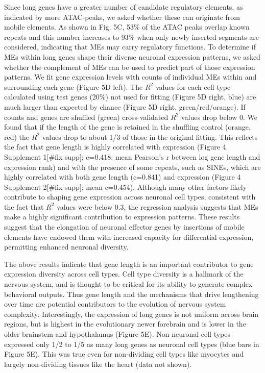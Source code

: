 Since long genes have a greater number of candidate regulatory elements, as indicated by more ATAC-peaks, we asked whether these can originate from mobile elements. As shown in Fig. 5C, 53\% of the ATAC peaks overlap known repeats and this number increases to 93\% when only newly inserted segments are considered, indicating that MEs may carry regulatory functions. To determine if MEs within long genes shape their diverse neuronal expression patterns, we asked whether the complement of MEs can be used to predict part of those expression patterns. We fit gene expression levels with counts of individual MEs within and surrounding each gene (Figure 5D left). The $R^2$ values for each cell type calculated using test genes (20\%) not used for fitting (Figure 5D right, blue) are much larger than expected by chance (Figure 5D right, green/red/orange). If counts and genes are shuffled (green) cross-validated $R^2$ values drop below 0. We found that if the length of the gene is retained in the shuffling control (orange, red) the $R^2$ values drop to about 1/3 of those in the original fitting. This reflects the fact that gene length is highly correlated with expression (Figure 4 Supplement 1[#fix supp]; c=0.418: mean Pearson’s r between log gene length and expression rank) and with the presence of some repeats, such as SINEs, which are highly correlated with both gene length (c=0.841) and expression (Figure 4 Supplement 2[#fix supp]; mean c=0.454). Although many other factors likely contribute to shaping gene expression across neuronal cell types, consistent with the fact that $R^2$ values were below 0.3, the regression analysis suggests that MEs make a highly significant contribution to expression patterns. These results suggest that the elongation of neuronal effector genes by insertions of mobile elements have endowed them with increased capacity for differential expression, permitting enhanced neuronal diversity. 

The above results indicate that gene length is an important contributor to gene expression diversity across cell types. Cell type diversity is a hallmark of the nervous system, and is thought to be critical for its ability to generate complex behavioral outputs. Thus gene length and the mechanisms that drive lengthening over time are potential contributors to the evolution of nervous system complexity. Interestingly, the expression of long genes is not uniform across brain regions, but is highest in the evolutionary newer forebrain and is lower in the older brainstem and hypothalamus (Figure 5E). Non-neuronal cell types expressed only 1/2 to 1/5 as many long genes as neuronal cell types (blue bars in Figure 5E). This was true even for non-dividing cell types like myocytes and largely non-dividing tissues like the heart (data not shown). 

